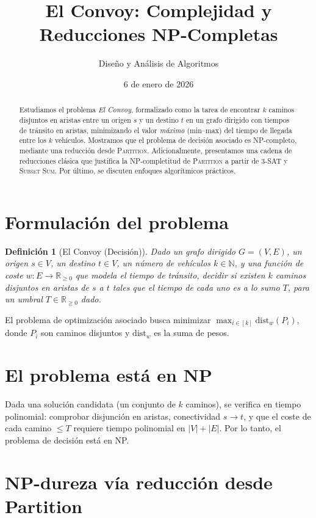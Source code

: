 \documentclass[11pt]{article}
\title{El Convoy: Complejidad y Reducciones NP-Completas}
\author{Diseño y Análisis de Algoritmos}
\date{6 de enero de 2026}
\newtheorem{definition}{Definición}
\begin{document}
\maketitle

\begin{abstract}
Estudiamos el problema \emph{El Convoy}, formalizado como la tarea de encontrar $k$ caminos disjuntos en aristas entre un origen $s$ y un destino $t$ en un grafo dirigido con tiempos de tránsito en aristas, minimizando el valor \emph{máximo} (min--max) del tiempo de llegada entre los $k$ vehículos. Mostramos que el problema de decisión asociado es NP-completo, mediante una reducción desde \textsc{Partition}. Adicionalmente, presentamos una cadena de reducciones clásica que justifica la NP-completitud de \textsc{Partition} a partir de \textsc{3-SAT} y \textsc{Subset Sum}. Por último, se discuten enfoques algorítmicos prácticos.
\end{abstract}

\section{Formulación del problema}
\begin{definition}[El Convoy (Decisión)]
Dado un grafo dirigido $G=(V,E)$, un origen $s\in V$, un destino $t\in V$, un número de vehículos $k\in \mathbb{N}$, y una función de coste $w:E\to \mathbb{R}_{\ge 0}$ que modela el tiempo de tránsito, decidir si existen $k$ caminos \emph{disjuntos en aristas} de $s$ a $t$ tales que el tiempo de cada uno es a lo sumo $T$, para un umbral $T\in \mathbb{R}_{\ge 0}$ dado.
\end{definition}

El problema de optimización asociado busca minimizar $\max_{i\in[k]} \text{dist}_w(P_i)$, donde $P_i$ son caminos disjuntos y $\text{dist}_w$ es la suma de pesos.

\section{El problema está en NP}
Dada una solución candidata (un conjunto de $k$ caminos), se verifica en tiempo polinomial: comprobar disjunción en aristas, conectividad $s\to t$, y que el coste de cada camino $\le T$ requiere tiempo polinomial en $|V|+|E|$. Por lo tanto, el problema de decisión está en NP.

\section{NP-dureza vía reducción desde Partition}
\end{document}
